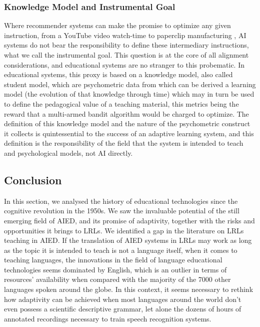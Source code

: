         \subsubsection{Knowledge Model and Instrumental Goal}
Where recommender systems can make the promise to optimize any given instruction, from a YouTube video watch-time to paperclip manufacturing \parencite{bostrom_ethical_2003}, AI systems do not bear the responsibility to define these intermediary instructions, what we call the instrumental goal. This question is at the core of all alignment considerations, and educational systems are no stranger to this probematic. In educational systems, this proxy is based on a knowledge model, also called student model, which are psychometric data from which can be derived a learning model (the evolution of that knowledge through time) which may in turn be used to define the pedagogical value of a teaching material, this metrics being the reward that a multi-armed bandit algorithm would be charged to optimize. The definition of this knowledge model and the nature of the psychometric construct it collects is quintessential to the success of an adaptive learning system, and this definition is the responsibility of the field that the system is intended to teach and psychological models, not AI directly.

    \subsection{Conclusion}
In this section, we analysed the history of educational technologies since the cognitive revolution in the 1950s. We saw the invaluable potential of the still emerging field of AIED, and its promise of adaptivity, together with the risks and opportunities it brings to LRLs. We identified a gap in the literature on LRLs teaching in AIED. If the translation of AIED systems in LRLs may work as long as the topic it is intended to teach is not a language itself, when it comes to teaching languages, the innovations in the field of language educational technologies seems dominated by English, which is an outlier in terms of resources' availability when compared with the majority of the 7000 other languages spoken around the globe. In this context, it seems necessary to rethink how adaptivity can be achieved when most languages around the world don't even possess a scientific descriptive grammar, let alone the dozens of hours of annotated recordings necessary to train speech recognition systems.

